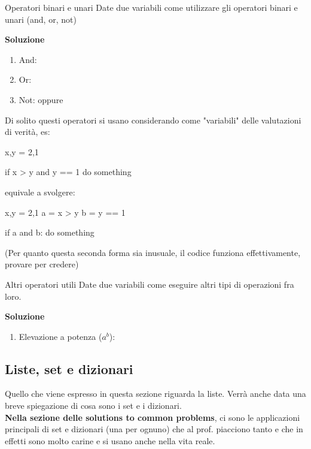 \documentclass[10pt]{extarticle}
\makeatletter
\newcommand{\<}{\langle}
\renewcommand{\>}{\rangle}
\renewenvironment{proof}[1][\proofname] {\par\pushQED{\qed}
\renewcommand*{\proofname}{Soluzione}
{\normalfont\sffamily\bfseries\topsep6\p@\@plus6\p@\relax #1\@addpunct{.} }}{\popQED\endtrivlist\@endpefalse}
\theoremstyle{mystyle}{\newtheorem*{remark}{Nota}}
\theoremstyle{mystyle}{\newtheorem*{remarks}{Note}}
\theoremstyle{mystyle}{\newtheorem*{example}{Esempio}}
\theoremstyle{mystyle}{\newtheorem*{examples}{Esempi}}
\theoremstyle{definition}{\newtheorem*{exercise}{Exercise}}
\theoremstyle{warn}
\makeatother
\begin{document}
\begin{definition}{Operatori binari e unari}{}
Date due variabili  come utilizzare gli operatori binari e unari (and, or, not)
\end{definition}
\begin{proof}
\begin{enumerate}
    \item And: 
    \item Or: 
    \item Not:  oppure 
\end{enumerate}
\end{proof}
\begin{remark}
Di solito questi operatori si usano considerando come "variabili" delle valutazioni di verità, es:
\begin{python}
x,y = 2,1

if x > y and y == 1
    do something
\end{python}
equivale a svolgere:
\begin{python}
x,y = 2,1
a = x > y
b = y == 1

if a and b:
    do something
\end{python}
(Per quanto questa seconda forma sia inusuale, il codice funziona effettivamente, provare per credere)
\end{remark}
\begin{definition}{Altri operatori utili}{}
Date due variabili  come eseguire altri tipi di operazioni fra loro.
\end{definition}
\begin{proof}
\begin{enumerate}
    \item Elevazione a potenza ($a^b$): 
\end{enumerate}
\end{proof}

\newpage
\subsection{Liste, set e dizionari}
Quello che viene espresso in questa sezione riguarda la liste. Verrà anche data una breve spiegazione di cosa sono i set e i dizionari.\\
\textbf{Nella sezione delle solutions to common problems}, ci sono le applicazioni principali di set e dizionari (una per ognuno) che al prof. piacciono tanto e che in effetti sono molto carine e si usano anche nella vita reale.
\end{document}
